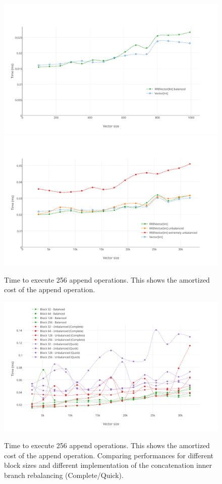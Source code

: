 \begin{figure}[h!]
  \centering
  \includegraphics[width=\textwidth]{Benchmarks/Append_2.pdf}
  \includegraphics[width=\textwidth]{Benchmarks/Append_3.pdf}
  \label{AppendBenchmarks}
  \caption{Time to execute 256 append operations. This shows the amortized cost of the append operation.}
\end{figure}


\begin{figure}[h!]
  \centering
  \includegraphics[width=\textwidth]{Benchmarks/Append_blocks_3.pdf}
  \label{IterationBlocksBenchmarks}
  \caption{Time to execute 256 append operations. This shows the amortized cost of the append operation. Comparing performances for different block sizes and different implementation of the concatenation inner branch rebalancing (Complete/Quick).}
\end{figure}

